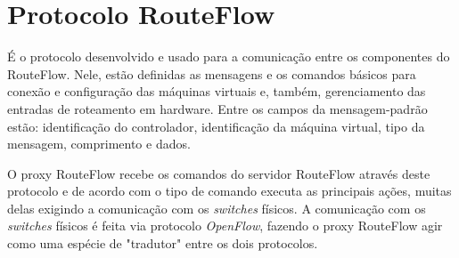 \section{Protocolo RouteFlow}

É o protocolo desenvolvido e usado para a comunicação entre
os componentes do RouteFlow. Nele, estão definidas as
mensagens e os comandos básicos para conexão e configuração
das máquinas virtuais e, também, gerenciamento das entradas
de roteamento em hardware. Entre os campos da
mensagem-padrão estão: identificação do controlador,
identificação da máquina virtual, tipo da mensagem,
comprimento e dados. 

O proxy RouteFlow recebe os comandos do
servidor RouteFlow através deste protocolo e de acordo com o
tipo de comando executa as principais ações, muitas delas
exigindo a comunicação com os \textit{switches} físicos. A
comunicação com os \textit{switches} físicos é feita via protocolo
\textit{OpenFlow}, fazendo o proxy RouteFlow agir como
uma espécie de "tradutor" entre os dois protocolos.
